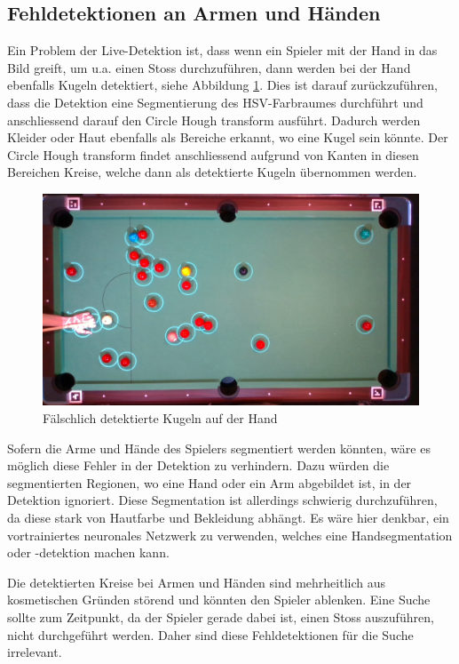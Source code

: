 \subsection{Fehldetektionen an Armen und Händen}\label{kap:detektion_arme_haende}
Ein Problem der Live-Detektion ist, dass wenn ein Spieler mit der Hand in das Bild greift, um u.a. einen Stoss
durchzuführen, dann werden bei der Hand ebenfalls Kugeln detektiert, siehe Abbildung \ref{fig:detection_hand_problem}.
Dies ist darauf zurückzuführen, dass die Detektion eine Segmentierung des HSV-Farbraumes durchführt \cite{project2:snooker_detection}
und anschliessend darauf den Circle Hough transform \cite{wiki:circle_hough} ausführt.
Dadurch werden Kleider oder Haut ebenfalls als Bereiche erkannt, wo eine Kugel sein könnte.
Der Circle Hough transform findet anschliessend aufgrund von Kanten in diesen Bereichen Kreise,
welche dann als detektierte Kugeln übernommen werden.

\begin{figure}[h!]
    \begin{center}
        \includegraphics[width=0.8\linewidth]{../common/04_results/resources/detektierte_kugeln_auf_der_hand.png}
    \end{center}
    \caption{Fälschlich detektierte Kugeln auf der Hand}
    \label{fig:detection_hand_problem}
\end{figure}

Sofern die Arme und Hände des Spielers segmentiert werden könnten, wäre es möglich diese Fehler in der Detektion zu verhindern.
Dazu würden die segmentierten Regionen, wo eine Hand oder ein Arm abgebildet ist, in der Detektion ignoriert.
Diese Segmentation ist allerdings schwierig durchzuführen, da diese stark von Hautfarbe und Bekleidung abhängt.
Es wäre hier denkbar, ein vortrainiertes neuronales Netzwerk zu verwenden, welches eine Handsegmentation oder -detektion machen kann.

Die detektierten Kreise bei Armen und Händen sind mehrheitlich aus kosmetischen Gründen störend und könnten den Spieler ablenken.
Eine Suche sollte zum Zeitpunkt, da der Spieler gerade dabei ist, einen Stoss auszuführen, nicht durchgeführt werden.
Daher sind diese Fehldetektionen für die Suche irrelevant.
